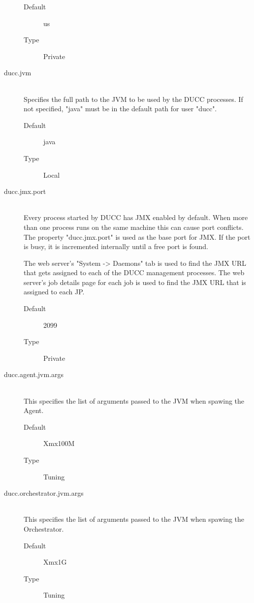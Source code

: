 \begin{description}
         \begin{description}
           \item[Default] us 
           \item[Type] Private 
         \end{description}

       \item[ducc.jvm] \hfill \\
         Specifies the full path to the JVM to be used by the DUCC processes. If not specified, 
         "java" must be in the default path for user "ducc". 
         \begin{description}
           \item[Default] java 
           \item[Type] Local 
         \end{description}

       \item[ducc.jmx.port] \hfill \\
         Every process started by DUCC has JMX enabled by default. When more than one process 
         runs on the same machine this can cause port conflicts. The property "ducc.jmx.port" is 
         used as the base port for JMX. If the port is busy, it is incremented internally until a free 
         port is found. 
         
         The web server's "System -> Daemons" tab is used to find the JMX URL that gets assigned 
         to each of the DUCC management processes. The web server's job details page for each 
         job is used to find the JMX URL that is assigned to each JP. 
         
         \begin{description}
           \item[Default] 2099 
           \item[Type] Private 
         \end{description}

       \item[ducc.agent.jvm.args] \hfill \\
         This specifies the list of arguments passed to the JVM when spawing the Agent. 
         \begin{description}           
           \item[Default] Xmx100M 
           \item[Type] Tuning 
         \end{description}

       \item[ducc.orchestrator.jvm.args] \hfill \\
         This specifies the list of arguments passed to the JVM when spawing the Orchestrator. 
         \begin{description}
           \item[Default] Xmx1G 
           \item[Type] Tuning 
         \end{description}


\end{description}
